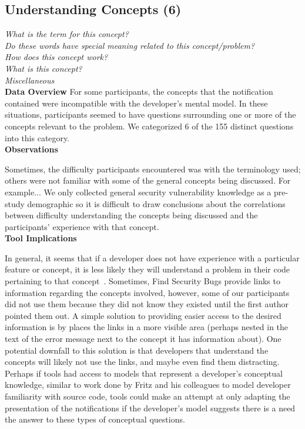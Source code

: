 \documentclass[conference]{IEEEtran}
\begin{document}

\noindent\subsection{\textbf{Understanding Concepts (6)}}\label{uc}

\noindent\emph{What is the term for this concept?} \\
\emph{Do these words have special meaning related to this concept/problem?} \\
\emph{How does this concept work?} \\
\emph{What is this concept?} \\
\emph{Miscellaneous} \\


\noindent\textbf{Data Overview}
For some participants, the concepts that the notification contained were incompatible with the developer's mental model. 
In these situations, participants seemed to have questions surrounding one or more of the concepts relevant to the problem.
We categorized 6 of the 155 distinct questions into this category. 
\\

\noindent\textbf{Observations}


Sometimes, the difficulty participants encountered was with the terminology used; others were not familiar with some of the general concepts being discussed. For example...
We only collected general security vulnerability knowledge as a pre-study demographic so it is difficult to draw conclusions about the correlations between difficulty understanding the concepts being discussed and the participants' experience with that concept.
\\

\noindent\textbf{Tool Implications}

In general, it seems that if a developer does not have experience with a particular feature or concept, it is less likely they will understand a problem in their code pertaining to that concept~\cite{}.%
Sometimes, Find Security Bugs provide links to information regarding the concepts involved, however, some of our participants did not use them because they did not know they existed until the first author pointed them out. 
A simple solution to providing easier access to the desired information is by places the links in a  more visible area (perhaps nested in the text of the error message next to the concept it has information about). 
One potential downfall to this solution is that developers that understand the concepts will likely not use the links, and maybe even find them distracting.   
Perhaps if tools had access to models that represent a developer's conceptual knowledge, similar to work done by Fritz and his colleagues to model developer familiarity with source code, tools could make an attempt at only adapting the presentation of the notifications if the developer's model suggests there is a need the answer to these types of conceptual questions.
\end{document}
